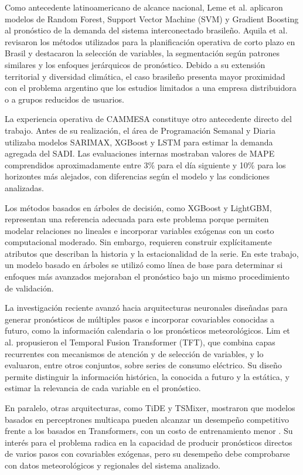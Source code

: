Como antecedente latinoamericano de alcance nacional, Leme et al. \cite{leme2020brazil} aplicaron modelos de Random Forest, Support Vector Machine (SVM) y Gradient Boosting al pronóstico de la demanda del sistema interconectado brasileño. Aquila et al. \cite{aquila2023overview} revisaron los métodos utilizados para la planificación operativa de corto plazo en Brasil y destacaron la selección de variables, la segmentación según patrones similares y los enfoques jerárquicos de pronóstico. Debido a su extensión territorial y diversidad climática, el caso brasileño presenta mayor proximidad con el problema argentino que los estudios limitados a una empresa distribuidora o a grupos reducidos de usuarios.

La experiencia operativa de CAMMESA constituye otro antecedente directo del trabajo. Antes de su realización, el área de Programación Semanal y Diaria utilizaba modelos SARIMAX, XGBoost y LSTM para estimar la demanda agregada del SADI. Las evaluaciones internas mostraban valores de MAPE comprendidos aproximadamente entre 3\% para el día siguiente y 10\% para los horizontes más alejados, con diferencias según el modelo y las condiciones analizadas.

Los métodos basados en árboles de decisión, como XGBoost y LightGBM, representan una referencia adecuada para este problema porque permiten modelar relaciones no lineales e incorporar variables exógenas con un costo computacional moderado. Sin embargo, requieren construir explícitamente atributos que describan la historia y la estacionalidad de la serie. En este trabajo, un modelo basado en árboles se utilizó como línea de base para determinar si enfoques más avanzados mejoraban el pronóstico bajo un mismo procedimiento de validación.

La investigación reciente avanzó hacia arquitecturas neuronales diseñadas para generar pronósticos de múltiples pasos e incorporar covariables conocidas a futuro, como la información calendaria o los pronósticos meteorológicos. Lim et al. \cite{lim2021tft} propusieron el Temporal Fusion Transformer (TFT), que combina capas recurrentes con mecanismos de atención y de selección de variables, y lo evaluaron, entre otros conjuntos, sobre series de consumo eléctrico. Su diseño permite distinguir la información histórica, la conocida a futuro y la estática, y estimar la relevancia de cada variable en el pronóstico.

En paralelo, otras arquitecturas, como TiDE y TSMixer, mostraron que modelos basados en perceptrones multicapa pueden alcanzar un desempeño competitivo frente a los basados en Transformers, con un costo de entrenamiento menor \cite{das2023tide,chen2023tsmixer}. Su interés para el problema radica en la capacidad de producir pronósticos directos de varios pasos con covariables exógenas, pero su desempeño debe comprobarse con datos meteorológicos y regionales del sistema analizado.

